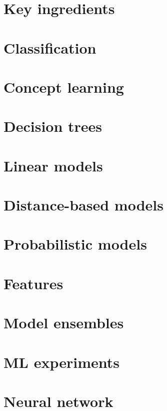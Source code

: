 \documentclass[8pt]{extarticle} %
\begin{document}
\raggedright
\begin{multicols}{3}
\section{Key ingredients}

\section{Classification}

\section{Concept learning}

\section{Decision trees}

\section{Linear models}

\section{Distance-based models}

\section{Probabilistic models}

\section{Features}

\section{Model ensembles}

\section{ML experiments}

\section{Neural network}

\end{multicols}
\end{document}
